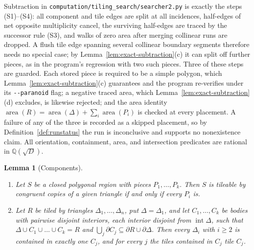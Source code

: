 \documentclass[11pt]{amsart}
\newtheorem{lemma}[theorem]{Lemma}
\theoremstyle{definition}
\theoremstyle{remark}
\newcommand{\Q}{\mathbb Q}
\newcommand{\pathcode}[1]{\nolinkurl{#1}}
\begin{document}
Subtraction in \pathcode{computation/tiling_search/searcher2.py} is exactly
the steps (S1)--(S4): all component and tile edges are split at all
incidences, half-edges of net opposite multiplicity cancel, the surviving
half-edges are traced by the successor rule (S3), and walks of zero area
after merging collinear runs are dropped.  A flush tile edge spanning several
collinear boundary segments therefore needs no special case; by
Lemma~\ref{lem:exact-subtraction}(c) it can split off further pieces, as in
the program's regression with two such pieces.  Three of these steps are
guarded.  Each stored piece is required to be a simple polygon, which
Lemma~\ref{lem:exact-subtraction}(c) guarantees and the program re-verifies
under its \texttt{-{}-paranoid} flag; a negative traced area, which
Lemma~\ref{lem:exact-subtraction}(d) excludes, is likewise rejected; and the
area identity
$\operatorname{area}(R)=\operatorname{area}(\Delta)+\sum_i
\operatorname{area}(P_i)$
is checked at every placement.  A failure of any of the three is recorded as
a skipped placement, so by Definition~\ref{def:runstatus} the run is
inconclusive and supports no nonexistence claim.  All orientation,
containment, area, and intersection predicates are rational in
$\Q(\sqrt D)$.

\begin{lemma}[Components]\label{lem:components}
\begin{enumerate}[label=\textup{(\roman*)}]
\item Let $S$ be a closed polygonal region with pieces $P_1,\dots,P_k$.
      Then $S$ is tileable by congruent copies of a given triangle if and
      only if every $P_i$ is.
\item Let $R$ be tiled by triangles $\Delta_1,\dots,\Delta_n$, put
      $\Delta=\Delta_1$, and let $C_1,\dots,C_k$ be bodies with pairwise
      disjoint interiors, each interior disjoint from
      $\operatorname{int}\Delta$, such that
      $\Delta\cup C_1\cup\dots\cup C_k=R$ and
      $\bigcup_j\partial C_j\subseteq\partial R\cup\partial\Delta$.  Then
      every $\Delta_i$ with $i\ge2$ is contained in exactly one $C_j$, and
      for every $j$ the tiles contained in $C_j$ tile $C_j$.
\end{enumerate}
\end{lemma}
\end{document}
